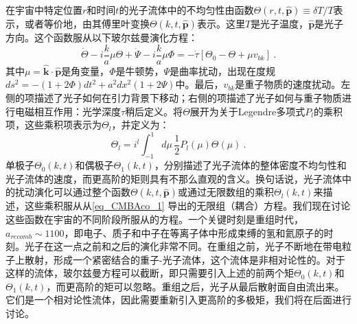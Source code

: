 在宇宙中特定位置$r$和时间$t$的光子流体中的不均匀性由函数$\Theta(r, t, \hat{\mathbf{p}}) \equiv \delta T/T$表示，或者等价地，由其傅里叶变换$\Theta(k, t, \hat{\mathbf{p}})$表示。这里$T$是光子温度，$\hat{\mathbf{p}}$是光子方向。这个函数服从以下玻尔兹曼演化方程：
\begin{equation}\label{eq_CMBAco_1} 
\dot{\Theta} - i \frac{k}{a}\mu  \Theta + \dot{\Psi} - i \frac{k}{a} \mu  \Phi = - \dot{\tau}[\Theta_0 - \Theta + \mu v_{b k}]~. 
\end{equation}
其中$\mu = \hat{\mathbf{k}} \cdot \hat{\mathbf{p}}$是角变量，$\Phi$是牛顿势，$\Psi$是曲率扰动，出现在度规$d s^2 = -(1 + 2\Phi)dt^2 + a^2 d x^2(1 + 2\Psi)$中。最后，$v_{b k}$是重子物质的速度扰动。左侧的项描述了光子如何在引力背景下移动；右侧的项描述了光子如何与重子物质进行电磁相互作用：光学深度$\tau$稍后定义。将$\Theta$展开为关于Legendre多项式$P_l$的乘积项，这些乘积项表示为$\Theta_l$，并定义为：
\begin{equation}
\Theta_l = i^l\int_{-1}^{1} d\mu \, \frac{1}{2} P_l(\mu) \Theta(\mu)~.
\end{equation}
单极子$\Theta_0(k, t)$和偶极子$\Theta_1(k, t)$，分别描述了光子流体的整体密度不均匀性和光子流体的速度，而更高阶的矩则具有不那么直观的含义。换句话说，光子流体中的扰动演化可以通过整个函数$\Theta(k, t, \hat{\mathbf p})$或通过无限数组的乘积$\Theta_l(k, t)$来描述，这些乘积服从从\autoref{eq_CMBAco_1} 导出的无限组（耦合）方程。我们现在讨论这些函数在宇宙的不同阶段所服从的方程。一个关键时刻是重组时代，$a_{recomb} \sim 1100$，即电子、质子和中子在等离子体中形成束缚的氢和氦原子的时刻。光子在这一点之前和之后的演化非常不同。在重组之前，光子不断地在带电粒子上散射，形成一个紧密结合的重子-光子流体，这个流体是非相对论性的。对于这样的流体，玻尔兹曼方程可以截断，即只需要引入上述的前两个矩$\Theta_0(k, t)$和$\Theta_1(k, t)$，而更高阶的矩可以忽略。重组之后，光子从最后散射面自由流出来。它们是一个相对论性流体，因此需要重新引入更高阶的多极矩，我们将在后面进行讨论。

